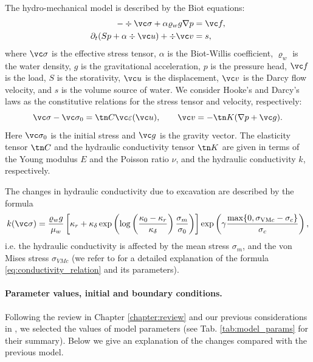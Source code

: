 The hydro-mechanical model is described by the Biot equations:
\begin{equation}
\begin{aligned}
-\div\vc\sigma + \alpha\varrho_w g\nabla p &= \vc f,\\
\partial_t(S p+\alpha\div\vc u) + \div\vc v &= s,
\end{aligned}
\end{equation}
where $\vc\sigma$ is the effective stress tensor, $\alpha$ is the Biot-Willis coefficient, $\varrho_w$ is the water density, $g$ is the gravitational acceleration, $p$ is the pressure head, $\vc f$ is the load, $S$ is the storativity, $\vc u$ is the displacement, $\vc v$ is the Darcy flow velocity, and $s$ is the volume source of water.
We consider Hooke's and Darcy's laws as the constitutive relations for the stress tensor and velocity, respectively:
\begin{equation}
\vc\sigma - \vc\sigma_{0}=\tn C\vc\varepsilon(\vc u), \qquad \vc v = -\tn K(\nabla p+\vc g).
\end{equation}
Here $\vc\sigma_{0}$ is the initial stress and $\vc g$ is the gravity vector.
The elasticity tensor $\tn C$ and the hydraulic conductivity tensor $\tn K$ are given in terms of the Young modulus $E$ and the Poisson ratio $\nu$, and the hydraulic conductivity $k$, respectively.

The changes in hydraulic conductivity due to excavation are described by the formula
\begin{equation}\label{eq:conductivity_relation}
k(\vc\sigma) = \frac{\varrho_w g}{\mu_w} \left[
      \kappa_r + \kappa_\delta\exp\left(\log\left(\frac{\kappa_0 - \kappa_r}{\kappa_\delta}\right) \frac{\sigma_m}{\sigma_0}\right)
  \right] \exp\left(\gamma\frac{\max\{0,\sigma_{\mathrm{VM}c} - \sigma_c\}}{\sigma_c}\right),
\end{equation}
i.e. the hydraulic conductivity is affected by the mean stress $\sigma_m$, and the von Mises stress $\sigma_{VMc}$ (we refer to \cite{tz_design} for a detailed explanation of the formula \eqref{eq:conductivity_relation} and its parameters).

\paragraph{Parameter values, initial and boundary conditions.}
Following the review in Chapter \ref{chapter:review} and our previous considerations in \cite{tz_design}, we selected the values of model parameters (see Tab. \ref{tab:model_params} for their summary).
Below we give an explanation of the changes compared with the previous model.

